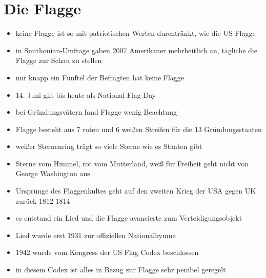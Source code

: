 \documentclass[10pt,a4paper,oneside,ngerman,numbers=noenddot]{scrartcl}
\newenvironment{myitemize}{\begin{itemize}\itemsep -9pt}{\end{itemize}} %
\begin{document}
\section*{Die Flagge}
\begin{myitemize}
    \item keine Flagge ist so mit patriotischen Werten durchtränkt, wie die US-Flagge
    \item in Smithonian-Umfrage gaben 2007 Amerikaner mehrheitlich an, tägliche die Flagge zur Schau zu stellen
    \item nur knapp ein Fünftel der Befragten hat keine Flagge
    \item 14. Juni gilt bis heute als National Flag Day
    \item bei Gründungsvätern fand Flagge wenig Beachtung
    \item Flagge besteht aus 7 roten und 6 weißen Streifen für die 13 Gründungsstaaten
    \item weißer Sternenring trägt so viele Sterne wie es Staaten gibt
    \item Sterne vom Himmel, rot vom Mutterland, weiß für Freiheit geht nicht von George Washington aus
    \item Ursprünge des Flaggenkultes geht auf den zweiten Krieg der USA gegen UK zurück 1812-1814
    \item es entstand ein Lied und die Flagge avancierte zum Verteidigungsobjekt
    \item Lied wurde erst 1931 zur offiziellen Nationalhymne
    \item 1942 wurde vom Kongress der US Flag Codex beschlossen
    \item in diesem Codex ist alles in Bezug zur Flagge sehr penibel geregelt
\end{myitemize}
\end{document}
